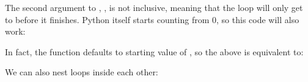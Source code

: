 \begin{sphinxVerbatim}[commandchars=\\\{\}]
    
   
\end{sphinxVerbatim}

The second argument to , , is not inclusive, meaning that
the loop will only get to  before it finishes.  Python itself
starts counting from 0, so this code will also work:

\begin{sphinxVerbatim}[commandchars=\\\{\}]
    
     
\end{sphinxVerbatim}

In fact, the  function defaults to starting value of , so the above is equivalent to:

\begin{sphinxVerbatim}[commandchars=\\\{\}]
   
     
\end{sphinxVerbatim}

We can also nest loops inside each other:

\begin{sphinxVerbatim}[commandchars=\\\{\}]
   
       
        
\end{sphinxVerbatim}

